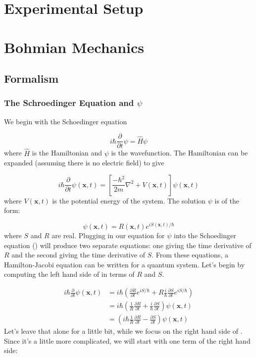 \section{Experimental Setup}

\section{Bohmian Mechanics}

\subsection{Formalism}
\subsubsection{The Schroedinger Equation and $\psi$}

We begin with the Schoedinger equation

\begin{equation}
i \hbar \frac{\partial}{\partial t}\psi = \hat H \psi
\end{equation}
where $\hat H$ is the Hamiltonian and $\psi$ is the wavefunction. The Hamiltonian can be expanded (assuming there is no electric field) to give

\begin{equation}
\label{SE}
i\hbar\frac{\partial}{\partial t} \psi(\mathbf{x},t) = \left [ \frac{-\hbar^2}{2 m}\nabla^2 + V(\mathbf{x},t)\right ] \psi(\mathbf{x},t)
\end{equation}
where $V(\mathbf{x},t)$ is the potential energy of the system. The solution $\psi$ is of the form:

\begin{equation}
\psi(\mathbf{x},t) = R(\mathbf{x},t) e^{i S(\mathbf{x},t) / \hbar}
\end{equation}
where $S$ and $R$ are real. Plugging in our equation for $\psi$ into the Schoedinger equation () will produce two separate equations: one giving the time derivative of $R$ and the second giving the time derivative of $S$. From these equations, a Hamilton-Jacobi equation can be written for a quantum system.
    Let's begin by computing the left hand side of  in terms of $R$ and $S$.   

$$
\begin{align*}
i\hbar\frac{\partial}{\partial t} \psi(\mathbf{x},t) &= i \hbar\left(\frac{\partial R}{\partial t} e^{i S / \hbar} + R \frac{i}{\hbar}\frac{\partial S}{\partial t} e^{i S / \hbar}\right)
\\ &= i \hbar \left(\frac{1}{R} \frac{\partial R}{\partial t} + \frac{i}{\hbar}\frac{\partial S}{\partial t}\right) \psi(\mathbf{x},t) 
\\ &= \left(i \hbar \frac{1}{R} \frac{\partial R}{\partial t} - \frac{\partial S}{\partial t}\right) \psi(\mathbf{x},t)
\end{align*}
$$
Let's leave that alone for a little bit, while we focus on the right hand side of . Since it's a little more complicated, we will start with one term of the right hand side:

